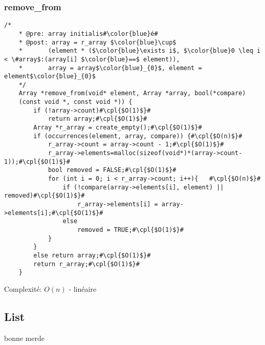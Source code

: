 \documentclass[a4paper, 11pt, oneside]{article}
\begin{document}
	\subsubsection{remove\_from}
	\begin{lstlisting}[mathescape]
	/*
	* @pre: array initialis#\color{blue}é#
	* @post: array = r_array $\color{blue}\cup$ 
	*		(element * ($\color{blue}\exists i$, $\color{blue}0 \leq i < \#array$:(array[i] $\color{blue}==$ element)),
	*		array = array$\color{blue}_{0}$, element = element$\color{blue}_{0}$
	*/
	Array *remove_from(void* element, Array *array, bool(*compare)    
	(const void *, const void *)) {
		if (!array->count)#\cpl{$O(1)$}#
			return array;#\cpl{$O(1)$}#
		Array *r_array = create_empty();#\cpl{$O(1)$}#
		if (occurrences(element, array, compare)) {#\cpl{$O(n)$}#
			r_array->count = array->count - 1;#\cpl{$O(1)$}#
			r_array->elements=malloc(sizeof(void*)*(array->count-1));#\cpl{$O(1)$}#
			bool removed = FALSE;#\cpl{$O(1)$}#
			for (int i = 0; i < r_array->count; i++){	#\cpl{$O(n)$}#
				if (!compare(array->elements[i], element) || removed)#\cpl{$O(1)$}#
					r_array->elements[i] = array->elements[i];#\cpl{$O(1)$}#
				else
					removed = TRUE;#\cpl{$O(1)$}#
			}
		}
		else return array;#\cpl{$O(1)$}#
		return r_array;#\cpl{$O(1)$}#
	}
	\end{lstlisting}
	Complexité: $O(n)$ - linéaire
	
	\clearpage
	\subsection{List}
	\color{blue} bonne merde \color{black}
	
\end{document}
